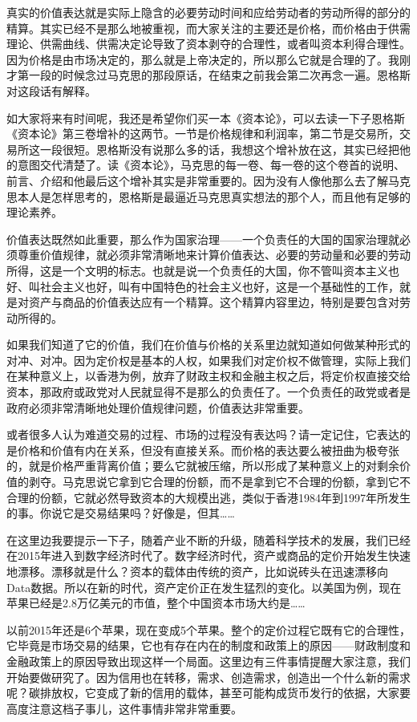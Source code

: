\documentclass[UTF8, 12pt, a4paper]{ctexrep}
\begin{document}
真实的价值表达就是实际上隐含的必要劳动时间和应给劳动者的劳动所得的部分的精算。其实已经不是那么地被重视，而大家关注的主要还是价格，而价格由于供需理论、供需曲线、供需决定论导致了资本剥夺的合理性，或者叫资本利得合理性。因为价格是由市场决定的，那么就是上帝决定的，所以那么它就是合理的了。我刚才第一段的时候念过马克思的那段原话，在结束之前我会第二次再念一遍。恩格斯对这段话有解释。

如大家将来有时间呢，我还是希望你们买一本《资本论》，可以去读一下子恩格斯《资本论》第三卷增补的这两节。一节是价格规律和利润率，第二节是交易所，交易所这一段很短。恩格斯没有说那么多的话，我想这个增补放在这，其实已经把他的意图交代清楚了。读《资本论》，马克思的每一卷、每一卷的这个卷首的说明、前言、介绍和他最后这个增补其实是非常重要的。因为没有人像他那么去了解马克思本人是怎样思考的，恩格斯是最逼近马克思真实想法的那个人，而且他有足够的理论素养。

价值表达既然如此重要，那么作为国家治理——一个负责任的大国的国家治理就必须尊重价值规律，就必须非常清晰地来计算价值表达、必要的劳动量和必要的劳动所得，这是一个文明的标志。也就是说一个负责任的大国，你不管叫资本主义也好、叫社会主义也好，叫有中国特色的社会主义也好，这是一个基础性的工作，就是对资产与商品的价值表达应有一个精算。这个精算内容里边，特别是要包含对劳动所得的。

如果我们知道了它的价值，我们在价值与价格的关系里边就知道如何做某种形式的对冲、对冲。因为定价权是基本的人权，如果我们对定价权不做管理，实际上我们在某种意义上，以香港为例，放弃了财政主权和金融主权之后，将定价权直接交给资本，那政府或政党对人民就显得不是那么的负责任了。一个负责任的政党或者是政府必须非常清晰地处理价值规律问题，价值表达非常重要。

或者很多人认为难道交易的过程、市场的过程没有表达吗？请一定记住，它表达的是价格和价值有内在关系，但没有直接关系。而价格的表达要么被扭曲为极夸张的，就是价格严重背离价值；要么它就被压缩，所以形成了某种意义上的对剩余价值的剥夺。马克思说它拿到它合理的份额，而不是拿到它不合理的份额，拿到它不合理的份额，它就必然导致资本的大规模出逃，类似于香港1984年到1997年所发生的事。你说它是交易结果吗？好像是，但其……

在这里边我要提示一下子，随着产业不断的升级，随着科学技术的发展，我们已经在2015年进入到数字经济时代了。数字经济时代，资产或商品的定价开始发生快速地漂移。漂移就是什么？资本的载体由传统的资产，比如说砖头在迅速漂移向Data数据。所以在新的时代，资产定价正在发生猛烈的变化。以美国为例，现在苹果已经是2.8万亿美元的市值，整个中国资本市场大约是……

以前2015年还是6个苹果，现在变成5个苹果。整个的定价过程它既有它的合理性，它毕竟是市场交易的结果，它也有存在内在的制度和政策上的原因——财政制度和金融政策上的原因导致出现这样一个局面。这里边有三件事情提醒大家注意，我们开始要做研究了。因为信用也在转移，需求、创造需求，创造出一个什么新的需求呢？碳排放权，它变成了新的信用的载体，甚至可能构成货币发行的依据，大家要高度注意这档子事儿，这件事情非常非常重要。
\end{document}
